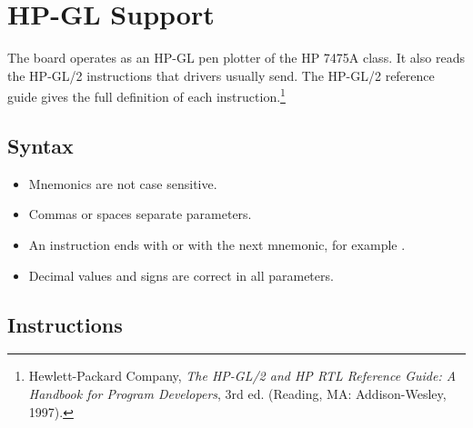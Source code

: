 \chapter{HP-GL Support}\label{app:hpgl}

The board operates as an HP-GL pen plotter of the HP 7475A class. It also
reads the HP-GL/2 instructions that drivers usually send. The HP-GL/2
reference guide gives the full definition of each
instruction.\footnote{Hewlett-Packard Company, \textit{The HP-GL/2 and HP RTL
Reference Guide: A Handbook for Program Developers}, 3rd ed. (Reading, MA:
Addison-Wesley, 1997).}

\section{Syntax}

\begin{itemize}
  \item Mnemonics are not case sensitive.
  \item Commas or spaces separate parameters.
  \item An instruction ends with \code{;} or with the next mnemonic, for
        example .
  \item Decimal values and signs are correct in all parameters.
\end{itemize}

\section{Instructions}

